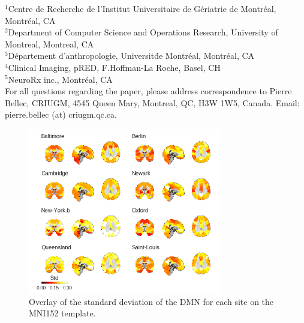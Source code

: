 \documentclass[authoryear]{elsarticle}
\begin{document}
$^1$Centre de Recherche de l'Institut Universitaire de G\'eriatrie de Montr\'eal, Montr\'eal, CA\\
$^2$Department of Computer Science and Operations Research, University of Montreal, Montreal, CA\\
$^3$D\'epartement d'anthropologie, Universit\' de Montr\'eal, Montr\'eal, CA\\
$^4$Clinical Imaging, pRED, F.Hoffman-La Roche, Basel, CH\\
$^5$NeuroRx inc., Montr\'eal, CA\\

For all questions regarding the paper, please address correspondence to Pierre Bellec, CRIUGM, 4545 Queen Mary, Montreal, QC, H3W 1W5, Canada. Email: pierre.bellec (at) criugm.qc.ca.\\


\begin{figure}[htbp]
\centering
\includegraphics[width=0.75\textwidth]{../figures/dmn_stdmultisite.png}
\caption[]{
Overlay of the standard deviation of the DMN for each site on the MNI152 template.
}
\label{fig_std_DMNs}
\end{figure}
\end{document}
